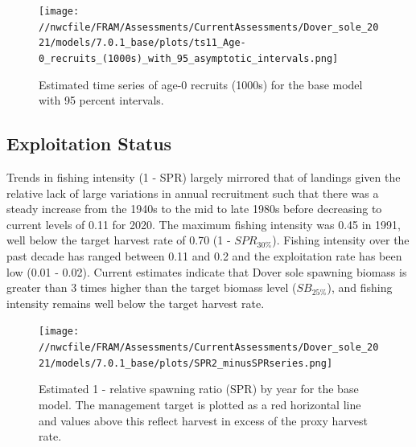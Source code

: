 \documentclass[11pt,
  english,
  a4paper,
]{article}
\begin{document}
\begin{figure}
\centering
\texttt{[image: //nwcfile/FRAM/Assessments/CurrentAssessments/Dover\_sole\_2021/models/7.0.1\_base/plots/ts11\_Age-0\_recruits\_(1000s)\_with\_95\_asymptotic\_intervals.png]}
\caption{Estimated time series of age-0 recruits (1000s) for the base model with 95 percent intervals.\label{fig:es-recruits}}
\end{figure}

\tagmcend\tagstructend

\clearpage


\hypertarget{exploitation-status}{%
\subsection*{Exploitation Status}\label{exploitation-status}}

\leavevmode\tagmcend\tagstructend


Trends in fishing intensity (1 - SPR) largely mirrored that of landings given the relative lack of large variations in annual recruitment such that there was a steady increase from the 1940s to the mid to late 1980s before decreasing to current levels of 0.11 for 2020. The maximum fishing intensity was 0.45 in 1991, well below the target harvest rate of 0.70 (1 - {\(SPR_{30\%}\)\leavevmode\tagmcend\tagstructend}). Fishing intensity over the past decade has ranged between 0.11 and 0.2 and the exploitation rate has been low (0.01 - 0.02). Current estimates indicate that Dover sole spawning biomass is greater than 3 times higher than the target biomass level ({\(SB_{25\%}\)\leavevmode\tagmcend\tagstructend}), and fishing intensity remains well below the target harvest rate.

\leavevmode\tagmcend\tagstructend\par




\begin{figure}
\centering
\texttt{[image: //nwcfile/FRAM/Assessments/CurrentAssessments/Dover\_sole\_2021/models/7.0.1\_base/plots/SPR2\_minusSPRseries.png]}
\caption{Estimated 1 - relative spawning ratio (SPR) by year for the base model. The management target is plotted as a red horizontal line and values above this reflect harvest in excess of the proxy harvest rate.\label{fig:es-1-spr}}
\end{figure}
\end{document}
